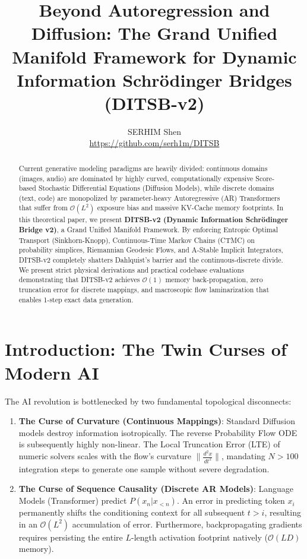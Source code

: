 \documentclass[11pt,a4paper]{article}
\title{Beyond Autoregression and Diffusion: The Grand Unified Manifold Framework for Dynamic Information Schr\"odinger Bridges (DITSB-v2)}
\author{SERHIM Shen \\ \href{https://github.com/serh1m/DITSB}{https://github.com/serh1m/DITSB}}
\date{}
\begin{document}
\maketitle

\begin{abstract}
Current generative modeling paradigms are heavily divided: continuous domains (images, audio) are dominated by highly curved, computationally expensive Score-based Stochastic Differential Equations (Diffusion Models), while discrete domains (text, code) are monopolized by parameter-heavy Autoregressive (AR) Transformers that suffer from $\mathcal{O}(L^2)$ exposure bias and massive KV-Cache memory footprints. In this theoretical paper, we present \textbf{DITSB-v2 (Dynamic Information Schr\"odinger Bridge v2)}, a Grand Unified Manifold Framework. By enforcing Entropic Optimal Transport (Sinkhorn-Knopp), Continuous-Time Markov Chains (CTMC) on probability simplices, Riemannian Geodesic Flows, and A-Stable Implicit Integrators, DITSB-v2 completely shatters Dahlquist's barrier and the continuous-discrete divide. We present strict physical derivations and practical codebase evaluations demonstrating that DITSB-v2 achieves $\mathcal{O}(1)$ memory back-propagation, zero truncation error for discrete mappings, and macroscopic flow laminarization that enables 1-step exact data generation.
\end{abstract}

\section{Introduction: The Twin Curses of Modern AI}
The AI revolution is bottlenecked by two fundamental topological disconnects:
\begin{enumerate}
    \item \textbf{The Curse of Curvature (Continuous Mappings)}: Standard Diffusion models destroy information isotropically. The reverse Probability Flow ODE is subsequently highly non-linear. The Local Truncation Error (LTE) of numeric solvers scales with the flow's curvature $\|\frac{d^2x}{dt^2}\|$, mandating $N>100$ integration steps to generate one sample without severe degradation.
    \item \textbf{The Curse of Sequence Causality (Discrete AR Models)}: Language Models (Transformer) predict $P(x_n | x_{<n})$. An error in predicting token $x_i$ permanently shifts the conditioning context for all subsequent $t > i$, resulting in an $\mathcal{O}(L^2)$ accumulation of error. Furthermore, backpropagating gradients requires persisting the entire $L$-length activation footprint natively ($\mathcal{O}(LD)$ memory).
\end{enumerate}
\end{document}
